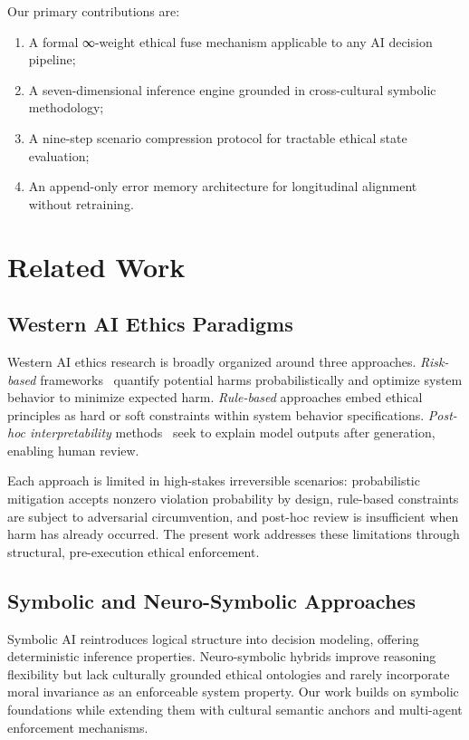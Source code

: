 \documentclass[conference]{IEEEtran}
\begin{document}
Our primary contributions are:

\begin{enumerate}
  \item A formal ∞-weight ethical fuse mechanism
        applicable to any AI decision pipeline;
  \item A seven-dimensional inference engine grounded
        in cross-cultural symbolic methodology;
  \item A nine-step scenario compression protocol for
        tractable ethical state evaluation;
  \item An append-only error memory architecture for
        longitudinal alignment without retraining.
\end{enumerate}

\section{Related Work}

\subsection{Western AI Ethics Paradigms}

Western AI ethics research is broadly organized around three
approaches. \textit{Risk-based} frameworks~\cite{floridi2020ethical}
quantify potential harms probabilistically and optimize system
behavior to minimize expected harm. \textit{Rule-based} approaches
embed ethical principles as hard or soft constraints within system
behavior specifications. \textit{Post-hoc interpretability}
methods~\cite{russell2019human} seek to explain model outputs
after generation, enabling human review.

Each approach is limited in high-stakes irreversible scenarios:
probabilistic mitigation accepts nonzero violation probability
by design, rule-based constraints are subject to adversarial
circumvention, and post-hoc review is insufficient when harm
has already occurred. The present work addresses these
limitations through structural, pre-execution ethical enforcement.

\subsection{Symbolic and Neuro-Symbolic Approaches}

Symbolic AI reintroduces logical structure into decision modeling,
offering deterministic inference properties. Neuro-symbolic
hybrids improve reasoning flexibility but lack culturally
grounded ethical ontologies and rarely incorporate moral
invariance as an enforceable system property. Our work builds
on symbolic foundations while extending them with cultural
semantic anchors and multi-agent enforcement mechanisms.
\end{document}
